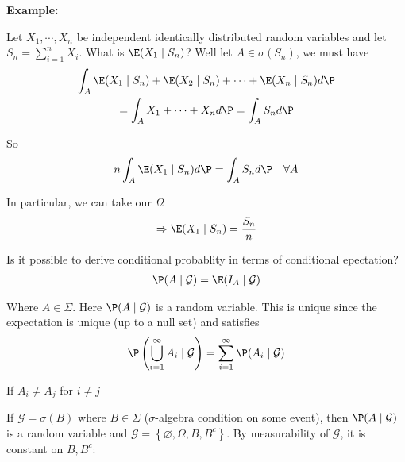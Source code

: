 \par\bigskip
\noindent\textbf{Example:}\par
\noindent Let $X_1,\cdots,X_n$ be independent identically distributed random variables and let $S_n = \sum_{i=1}^{n}X_i$. What is $\E(X_1\mid S_n)$? Well let $A\in \sigma(S_n)$, we must have 
\begin{equation*}
  \begin{gathered}
    \int_A \E(X_1\mid S_n) + \E(X_2\mid S_n)+\cdots+\E(X_n\mid S_n) d\P\\
    = \int_A X_1+\cdots+X_n d\P = \int_A S_nd\P
  \end{gathered}
\end{equation*}\par
\noindent So 
\begin{equation*}
  \begin{gathered}
    n\int_A \E(X_1\mid S_n)d\P = \int_A S_nd\P\quad\forall A
  \end{gathered}
\end{equation*}\par
\noindent In particular, we can take our $\Omega$
\begin{equation*}
  \begin{gathered}
    \Rightarrow \E(X_1\mid S_n) = \dfrac{S_n}{n}
  \end{gathered}
\end{equation*}
\par\bigskip
\noindent Is it possible to derive conditional probablity in terms of conditional epectation?
\begin{equation*}
  \begin{gathered}
    \P(A\mid\mathcal{G}) = \E(I_A\mid\mathcal{G})
  \end{gathered}
\end{equation*}\par
\noindent Where $A\in\Sigma$. Here $\P(A\mid\mathcal{G})$ is a random variable. This is unique since the expectation is unique (up to a null set) and satisfies
\begin{equation*}
  \begin{gathered}
    \P\left(\bigcup_{i=1}^{\infty}A_i\mid\mathcal{G}\right) = \sum_{i=1}^{\infty}\P(A_i\mid\mathcal{G})
  \end{gathered}
\end{equation*}\par
\noindent If $A_i\neq A_j$ for $i\neq j$
\par\bigskip
\noindent If $\mathcal{G} = \sigma(B)$ where $B\in\Sigma$ ($\sigma$-algebra condition on some event), then $\P(A\mid\mathcal{G})$ is a random variable and $\mathcal{G} = \left\{\varnothing, \Omega, B, B^c\right\}$. By measurability of $\mathcal{G}$, it is constant on $B,B^c$:
